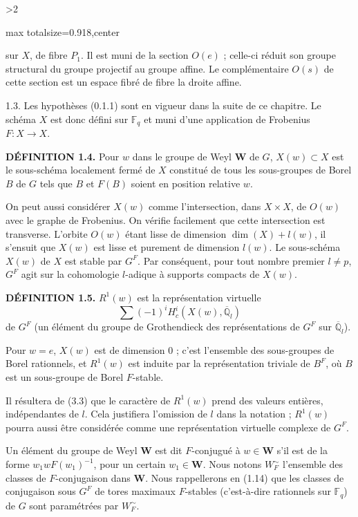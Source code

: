 \documentclass[9pt,twoside]{extarticle}
\newcommand{\EditionPage}[3]{%
  \ifnum#1>2\clearpage\fi
  \pdfbookmark[1]{Printed page #2}{fr-folio-#2}%
  \hypertarget{fr-physical-#1}{}%
  \noindent\begin{adjustbox}{max totalsize={\textwidth}{0.918\textheight},center}
  \begin{minipage}[t]{\textwidth}
  \fontsize{9.4}{11.1}\selectfont\justifying
  #3
  \end{minipage}
  \end{adjustbox}%
}
\begin{document}
\EditionPage{6}{107}{%
sur \(X\), de fibre \(P_1\). Il est muni de la section \(O(e)\) ; celle-ci réduit son groupe structural du groupe projectif au groupe affine. Le complémentaire \(O(s)\) de cette section est un espace fibré de fibre la droite affine.\par

1.3. Les hypothèses (0.1.1) sont en vigueur dans la suite de ce chapitre. Le schéma \(X\) est donc défini sur \(\mathbb{F}_q\) et muni d'une application de Frobenius \(F:X\to X\).\par

\noindent\textbf{DÉFINITION 1.4.} Pour \(w\) dans le groupe de Weyl \(\mathbf{W}\) de \(G\), \(X(w)\subset X\) est le sous-schéma localement fermé de \(X\) constitué de tous les sous-groupes de Borel \(B\) de \(G\) tels que \(B\) et \(F(B)\) soient en position relative \(w\).\par

On peut aussi considérer \(X(w)\) comme l'intersection, dans \(X\times X\), de \(O(w)\) avec le graphe de Frobenius. On vérifie facilement que cette intersection est transverse. L'orbite \(O(w)\) étant lisse de dimension \(\dim(X)+l(w)\), il s'ensuit que \(X(w)\) est lisse et purement de dimension \(l(w)\). Le sous-schéma \(X(w)\) de \(X\) est stable par \(G^F\). Par conséquent, pour tout nombre premier \(l\ne p\), \(G^F\) agit sur la cohomologie \(l\)-adique à supports compacts de \(X(w)\).\par

\noindent\textbf{DÉFINITION 1.5.} \(R^1(w)\) est la représentation virtuelle \[
\sum(-1)^i H_c^i(X(w),\overline{\mathbb{Q}}_l)
\] de \(G^F\) (un élément du groupe de Grothendieck des représentations de \(G^F\) sur \(\overline{\mathbb{Q}}_l\)).\par

Pour \(w=e\), \(X(w)\) est de dimension 0 ; c'est l'ensemble des sous-groupes de Borel rationnels, et \(R^1(w)\) est induite par la représentation triviale de \(B^F\), où \(B\) est un sous-groupe de Borel \(F\)-stable.\par

Il résultera de (3.3) que le caractère de \(R^1(w)\) prend des valeurs entières, indépendantes de \(l\). Cela justifiera l'omission de \(l\) dans la notation ; \(R^1(w)\) pourra aussi être considérée comme une représentation virtuelle complexe de \(G^F\).\par

Un élément du groupe de Weyl \(\mathbf{W}\) est dit \(F\)-conjugué à \(w\in\mathbf{W}\) s'il est de la forme \(w_1wF(w_1)^{-1}\), pour un certain \(w_1\in\mathbf{W}\). Nous notons \(W_F^{\sim}\) l'ensemble des classes de \(F\)-conjugaison dans \(\mathbf{W}\). Nous rappellerons en (1.14) que les classes de conjugaison sous \(G^F\) de tores maximaux \(F\)-stables (c'est-à-dire rationnels sur \(\mathbb{F}_q\)) de \(G\) sont paramétrées par \(W_F^{\sim}\).\par

}
\end{document}
